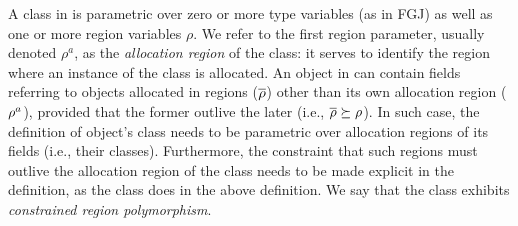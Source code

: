 A class in \FB is parametric over zero or more type variables (as in
FGJ) as well as one or more region variables $\rho$.
We refer to the first region parameter, usually denoted $\rho^a$, as
the \emph{allocation region} of the class: it serves to identify the
region where an instance of the class is allocated.
%
An object in \FB can contain fields referring to objects allocated in regions ($\overline{\rho}$) other than its
own allocation region ($\rho^a$), provided that the former outlive
the later (i.e., $\overline{\rho} \succeq \rho$). In such case, the
definition of object's class needs to be parametric over allocation
regions of its fields (i.e., their classes). Furthermore, the
constraint that such regions must outlive the allocation region of the
class needs to be made explicit in the definition, as the 
class does in the above definition. We say that the  class
exhibits \emph{constrained region polymorphism}.
%


